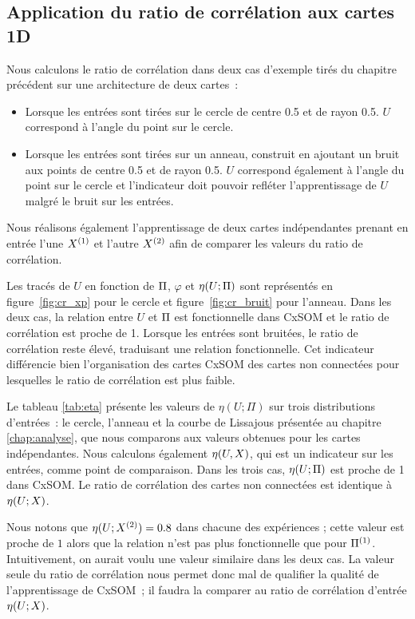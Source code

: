 \documentclass[../main]{subfiles}
\begin{document}
\subsection{Application du ratio de corrélation aux cartes 1D}

Nous calculons le ratio de corrélation dans deux cas d'exemple tirés du chapitre précédent sur une architecture de deux cartes~:
\begin{itemize}
    \item Lorsque les entrées sont tirées sur le cercle de centre 0.5 et de rayon 0.5. $U$ correspond à l'angle du point sur le cercle.
    \item Lorsque les entrées sont tirées sur un anneau, construit en ajoutant un bruit aux points de centre 0.5 et de rayon 0.5. $U$ correspond également à l'angle du point sur le cercle et l'indicateur doit pouvoir refléter l'apprentissage de $U$ malgré le bruit sur les entrées.
\end{itemize}
Nous réalisons également l'apprentissage de deux cartes indépendantes prenant en entrée l'une $X^{({1})}$ et l'autre $X^{({2})}$ afin de comparer les valeurs du ratio de corrélation.

Les tracés de $U$ en fonction de $\Pi$, $\varphi$ et $\eta(U;\Pi)$ sont représentés en figure~\ref{fig:cr_xp} pour le cercle et figure~\ref{fig:cr_bruit} pour l'anneau.
Dans les deux cas, la relation entre $U$ et $\Pi$ est fonctionnelle dans CxSOM et le ratio de corrélation est proche de 1. Lorsque les entrées sont bruitées, le ratio de corrélation reste élevé, traduisant une relation fonctionnelle.
Cet indicateur différencie bien l'organisation des cartes CxSOM des cartes non connectées pour lesquelles le ratio de corrélation est plus faible.

Le tableau \ref{tab:eta} présente les valeurs de $\eta(U;\Pi)$ sur trois distributions d'entrées~: le cercle, l'anneau et la courbe de Lissajous présentée au chapitre \ref{chap:analyse}, que nous comparons aux valeurs obtenues pour les cartes indépendantes. Nous calculons également $\eta(U,X)$, qui est un indicateur sur les entrées, comme point de comparaison.
Dans les trois cas, $\eta(U;\Pi)$ est proche de 1 dans CxSOM. Le ratio de corrélation des cartes non connectées est identique à $\eta(U;X)$.

Nous notons que $\eta(U;X^{({2})}) = 0.8$ dans chacune des expériences ; cette valeur est proche de $1$ alors que la relation n'est pas \og plus fonctionnelle \fg{} que pour $\Pi^{({1})}$. Intuitivement, on aurait voulu une valeur similaire dans les deux cas.
La valeur seule du ratio de corrélation nous permet donc mal de qualifier la qualité de l'apprentissage de CxSOM~; il faudra la comparer au ratio de corrélation d'entrée $\eta(U;X)$.
\end{document}
